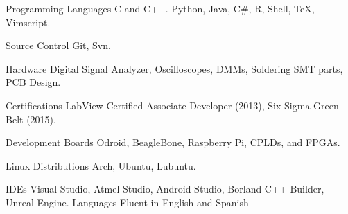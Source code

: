 
\begin{cvskills}


	\cvskill
		{Programming Languages}
			{C and C++. Python, Java, C\#, R, Shell, \TeX, Vimscript.}

	\cvskill
		{Source Control}
			{Git, Svn.}

	\cvskill
		{Hardware}
			{Digital Signal Analyzer, Oscilloscopes, DMMs, Soldering SMT parts, PCB Design.}

	\cvskill
		{Certifications}
			{LabView Certified Associate Developer (2013), Six Sigma Green Belt (2015).}

	\cvskill
		{Development Boards}
			{Odroid, BeagleBone, Raspberry Pi, CPLDs, and FPGAs.}

	\cvskill
		{Linux Distributions}
			{Arch, Ubuntu, Lubuntu.}

	\cvskill
		{IDEs}
			{Visual Studio, Atmel Studio, Android Studio, Borland C++ Builder, Unreal Engine.}
	\cvskill
		{Languages}
			{Fluent in English and Spanish}

\end{cvskills}
